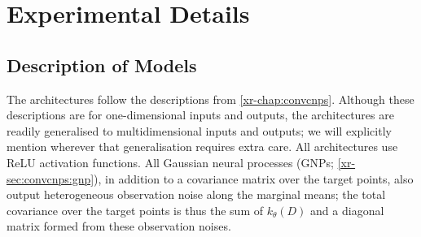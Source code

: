 \documentclass[12pt]{report}
\newcommand{\xrprefix}[1]{xr-#1}
\begin{document}
\chapter{Experimental Details}
\label{app:experimental_details}

\section{Description of Models}
\label{sec:experimental_details:models}

The architectures follow the descriptions from \cref{\xrprefix{chap:convcnps}}.
Although these descriptions are for one-dimensional inputs and outputs, the architectures are readily generalised to multidimensional inputs and outputs;
we will explicitly mention
wherever that generalisation requires extra care.
All architectures use ReLU activation functions.
All Gaussian neural processes (GNPs; \cref{\xrprefix{sec:convcnps:gnp}}),
in addition to a covariance matrix over the target points,
also output heterogeneous observation noise along the marginal means;
the total covariance over the target points is thus the sum of $k_\theta(D)$ and a diagonal matrix formed from these observation noises.
\end{document}
